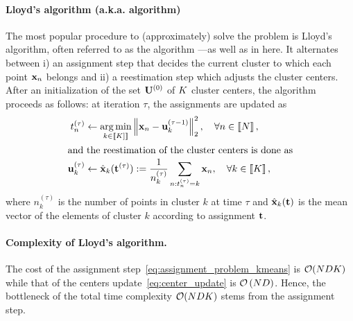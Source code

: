 \paragraph{Lloyd's algorithm (a.k.a. \kmeans algorithm)} The most popular procedure to (approximately) 
solve the \kmeans problem is Lloyd's algorithm, often referred to as the \kmeans algorithm ---as well as in here.
It alternates between
i) an assignment step that decides the current cluster to which each point ${\mathbf{x}}_n$
belongs and ii) a reestimation step which adjusts the cluster centers.
After an initialization of the set ${\mathbf{U}}^{(0)}$ of $K$
 cluster centers, the algorithm proceeds as follows: at iteration $\tau$,
  the assignments are updated as
\begin{align}
\label{eq:assignment_problem_kmeans}
 t_n^{(\tau)} &\leftarrow \operatorname*{arg\,min}_{k \in \left \llbracket K]\right \rrbracket} \left\|{\mathbf{x}}_{n} - {\mathbf{u}}_{k}^{(\tau-1)}\right\|_2^2,\quad \forall n\in\left \llbracket N\right \rrbracket,\\
\intertext{and the reestimation of the cluster centers is done as}
\label{eq:center_update}
{\mathbf{u}}^{(\tau)}_k &\leftarrow \hat{{\mathbf{x}}}_k({\mathbf{t}}^{(\tau)}) := \frac{1}{n_k^{(\tau)}} \sum_{n:t^{(\tau)}_n= k} {{\mathbf{x}}_{n}},\quad \forall k\in\left \llbracket K\right \rrbracket, 
\end{align}
where $n_k^{(\tau)}$ %
 is the number of points in cluster $k$
at time $\tau$ and $\hat{{\mathbf{x}}}_k({\mathbf{t}})$ is the mean vector of the elements of cluster $k$ according to assignment ${\mathbf{t}}$. 

\paragraph{Complexity of Lloyd's algorithm.} The cost of the assignment step~\eqref{eq:assignment_problem_kmeans} is $\mathcal{O}(NDK)$ while that of the centers update~\eqref{eq:center_update} is $\mathcal{O}\left (ND\right )$. Hence, the bottleneck of the total time complexity $\mathcal{O}(NDK)$ stems from the assignment step. %


